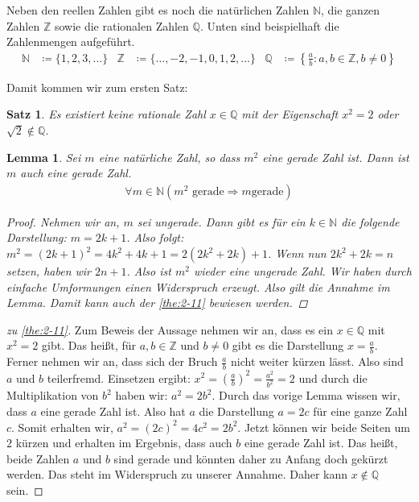 \documentclass[ngerman,titlepage,twoside, parskip=half*]{scrreprt}
\newcommand*{\N}{\mathbb{N}}
\newcommand*{\Z}{\mathbb{Z}}
\newcommand*{\Q}{\mathbb{Q}}
\theoremstyle{break}
\newtheorem{lemma}{Lemma}
\newtheorem{theorem}{Satz}[section]
\theoremstyle{nonumberbreak}
\newtheorem{proof}{Beweis:}
\begin{document}
Neben den reellen Zahlen gibt es noch die natürlichen Zahlen $\N$, die
ganzen Zahlen $\Z$ sowie die rationalen Zahlen $\Q$. Unten sind
beispielhaft die Zahlenmengen aufgeführt.
\begin{align*}
\N &\coloneqq \{1,2,3,\ldots\} &
\Z &\coloneqq \{\ldots ,-2,-1,0,1,2,\ldots\} &
\Q &\coloneqq \left\{\frac{a}{b}\colon a,b\in \Z, b \neq 0\right\}
\end{align*}

Damit kommen wir zum ersten Satz:
\begin{theorem}
  \label{the:2-11}
  Es existiert keine rationale Zahl $x\in \Q$ mit der Eigenschaft
  $x^2=2$ oder $\sqrt{2}\notin \Q$.
\end{theorem}

\begin{lemma}
  Sei $m$ eine natürliche Zahl, so dass $m^2$ eine gerade Zahl
  ist. Dann ist $m$ auch eine gerade Zahl.
  \begin{gather*}
    \forall m \in \N (m^2 \text{ gerade}\Rightarrow m \text{
      gerade})
  \end{gather*}
  \begin{proof}
    Nehmen wir an, $m$ sei ungerade. Dann gibt es für ein $k \in\N$
    die folgende
    Darstellung: $m=2k+1$. Also folgt: $m^{2}= (2k+1)^{2} = 4k^{2}+ 4k+1=
    2(2k^{2}+2k)+1$. Wenn nun $2k^{2}+2k=n$ setzen, haben wir $2n+1$. Also ist
    $m^{2}$ wieder eine ungerade Zahl. Wir haben durch einfache Umformungen
    einen Widerspruch erzeugt. Also gilt die Annahme im Lemma. Damit
    kann auch der \autoref{the:2-11} bewiesen werden.
  \end{proof}
\end{lemma}

\begin{proof}[zu \autoref{the:2-11}]
  Zum Beweis der Aussage nehmen wir an, dass es ein $x\in\Q$ mit $x^{2}=2$
  gibt. Das heißt, für $a,b\in\Z$ und $b\neq0$ gibt es die Darstellung
  $x=\frac{a}{b}$. Ferner nehmen wir an, dass sich der Bruch $\frac{a}{b}$
  nicht weiter kürzen lässt. Also sind $a$ und $b$ teilerfremd. Einsetzen
  ergibt: $x^{2}= (\frac{a}{b})^{2}= \frac{a^{2}}{b^{2}}=2$ und durch die
  Multiplikation von $b^{2}$ haben wir: $a^{2}= 2b^{2}$. Durch das vorige
  Lemma wissen wir, dass $a$ eine gerade Zahl ist. Also hat $a$ die
  Darstellung $a=2c$ für eine ganze Zahl $c$. Somit erhalten wir, $a^{2}=
  (2c)^{2}= 4c^{2}= 2b^{2}$. Jetzt können wir beide Seiten um $2$ kürzen und
  erhalten im Ergebnis, dass auch $b$ eine gerade Zahl ist. Das heißt, beide
  Zahlen $a$ und $b$ sind gerade und könnten daher zu Anfang doch gekürzt
  werden. Das steht im Widerspruch zu unserer Annahme. Daher kann $x\notin\Q$
  sein.
\end{proof}
\end{document}
